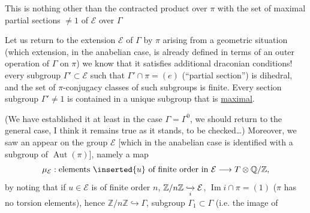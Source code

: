 This  is nothing other than the contracted product over
\(\pi\) with the set of maximal partial sections \(\ne1\) of
\(\mathcal E\) over \(\Gamma\)



Let us return to the extension \(\mathcal E\) of \(\Gamma\) by \(\pi\)
arising from a geometric situation
(which extension, in the anabelian case, is already defined in terms
of an outer operation of \(\Gamma\) on \(\pi\))
we know that it satisfies additional
draconian conditions!
every subgroup \(\Gamma'\subset\mathcal E\) such that
\(\Gamma'\cap\pi=(e)\) (``partial section'') is
 dihedral,
and the set of \(\pi\)-conjugacy classes of such subgroups
is finite.
Every section subgroup \(\Gamma'\ne1\) is contained in a unique
 subgroup that is \uline{maximal}.

(We have established it at least in the case
\(\Gamma=\Gamma^0\), we should return to the general case,
I think it remains true as it stands, to be checked\ldots)
Moreover, we saw an  appear
on the group \(\mathcal E\)
[which in the anabelian case is identified with a subgroup of
\(\operatorname{Aut}(\pi)\)], namely a map
\[
\mu_{\mathcal E}:
\text{elements }\inserted{u}\text{ of finite order in }\mathcal E
\longrightarrow T\otimes\mathbb Q/\mathbb Z,
\]
 by noting that if \(u\in\mathcal E\) is of finite order
\(n\),  \(\mathbb Z/n\mathbb Z\lhook\joinrel\xrightarrow[i]{}
\mathcal E\),  \(\operatorname{Im}i\cap\pi=(1)\)
(\(\pi\) has no torsion elements), hence
\(\mathbb Z/n\mathbb Z\hookrightarrow\Gamma\),  subgroup
\(\Gamma_1\subset\Gamma\) (i.e. the image of

